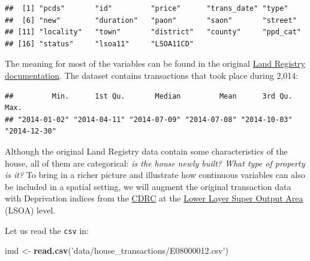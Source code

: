 \documentclass[
]{book}
\newenvironment{Shaded}{\begin{snugshade}}{\end{snugshade}}
\newcommand{\CommentTok}[1]{\textcolor[rgb]{0.56,0.35,0.01}{\textit{#1}}}
\newcommand{\KeywordTok}[1]{\textcolor[rgb]{0.13,0.29,0.53}{\textbf{#1}}}
\newcommand{\NormalTok}[1]{#1}
\newcommand{\OperatorTok}[1]{\textcolor[rgb]{0.81,0.36,0.00}{\textbf{#1}}}
\newcommand{\StringTok}[1]{\textcolor[rgb]{0.31,0.60,0.02}{#1}}
\begin{document}
\begin{verbatim}
##  [1] "pcds"       "id"         "price"      "trans_date" "type"      
##  [6] "new"        "duration"   "paon"       "saon"       "street"    
## [11] "locality"   "town"       "district"   "county"     "ppd_cat"   
## [16] "status"     "lsoa11"     "LSOA11CD"
\end{verbatim}

The meaning for most of the variables can be found in the original \href{https://www.gov.uk/guidance/about-the-price-paid-data\#explanations-of-column-headers-in-the-ppd}{Land Registry documentation}. The dataset contains transactions that took place during 2,014:

\begin{Shaded}
\end{Shaded}

\begin{verbatim}
##         Min.      1st Qu.       Median         Mean      3rd Qu.         Max. 
## "2014-01-02" "2014-04-11" "2014-07-09" "2014-07-08" "2014-10-03" "2014-12-30"
\end{verbatim}

Although the original Land Registry data contain some characteristics of the house, all of them are categorical: \emph{is the house newly built? What type of property is it?} To bring in a richer picture and illustrate how continuous variables can also be included in a spatial setting, we will augment the original transaction data with Deprivation indices from the \href{https://data.cdrc.ac.uk/dataset/cdrc-english-indices-of-deprivation-2015-geodata-pack-liverpool-e08000012}{CDRC} at the \href{http://neighbourhood.statistics.gov.uk/HTMLDocs/nessgeography/superoutputareasexplained/output-areas-explained.htm}{Lower Layer Super Output Area} (LSOA) level.

Let us read the \texttt{csv} in:

\begin{Shaded}
\begin{Highlighting}[]
\NormalTok{imd <-}\StringTok{ }\KeywordTok{read.csv}\NormalTok{(}\StringTok{'data/house_transactions/E08000012.csv'}\NormalTok{)}
\end{Highlighting}
\end{Shaded}
\end{document}
